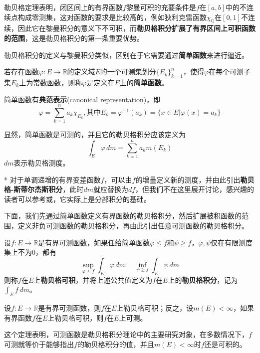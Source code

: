 勒贝格定理\cite{real_analysis}表明，闭区间上的有界函数$f$黎曼可积的充要条件是$f$在$[a,b]$中的不连续点构成零测集，这对函数的要求是比较高的，例如狄利克雷函数$\chi_{\mathbb{Q}}$在$[0,1]$不连续，因此它在黎曼积分的意义下不可积，而\textbf{勒贝格积分扩展了有界区间上可积函数的范围}，这是勒贝格积分的第一条重要优势。

勒贝格积分的定义与黎曼积分类似，区别在于它需要通过\textbf{简单函数}来进行逼近。

\begin{definition}[简单函数]
    若存在函数$\varphi:E\to\mathbb{R}$的定义域$E$的一个可测集划分$\{E_k\}_{k=1}^{n}$，使得$\varphi$在每个可测子集$E_k$上为常数函数，则称$\varphi$是定义在$E$上的\textbf{简单函数}。

    简单函数有\textbf{典范表示}(canonical representation)，即
    \[\varphi=\sum_{k=1}^{n}a_k\chi_{E_k},\text{其中}E_k=\varphi^{-1}(a_k)=\{x\in E|\varphi(x)=a_k\}\]
\end{definition}

显然，简单函数是可测的，并且它的勒贝格积分应该定义为
\[\int_{E}\varphi\,dm=\sum_{k=1}^{n}a_k m(E_k)\]
$dm$表示勒贝格测度。
\begin{remark}*
    对于单调递增的有界变差函数$f$，可以由$f$的增量定义新的测度，并由此引出\textbf{勒贝格-斯蒂尔杰斯积分}，此时$dm$就应替换为$df$，但我们不在这里展开讨论，感兴趣的读者可以参考\cite{simple_real_analysis}或\cite{chentianquan}，它实际上是分部积分的基础。
\end{remark}

下面，我们先通过简单函数定义有界函数的勒贝格积分，然后扩展被积函数的范围，定义非负可测函数的勒贝格积分，再由此引出任意可测函数的勒贝格积分。

\begin{definition}[有界函数的勒贝格积分]
    设$f:E\to\mathbb{R}$是有界可测函数，如果任给简单函数$\varphi\leq f$和$\psi\geq f$，$\varphi,\psi$仅在有限测度集上不为0，都有
    \[\sup_{\varphi\leq f}\int_{E}\varphi\,dm=\inf_{\psi\geq f}\int_{E}\psi\,dm\]
    则称$f$在$E$上\textbf{勒贝格可积}，并将上述公共值定义为$f$在$E$上的\textbf{勒贝格积分}，记为$\int_{E}f\,dm$。
\end{definition}

\begin{theorem}
    设$f:E\to\mathbb{R}$是有界可测函数，则$f$在$E$上勒贝格可积；反之，设$m(E)<\infty$，如果有界函数$f$在$E$上勒贝格可积，则$f$在$E$上可测。
\end{theorem}

这个定理表明，可测函数是勒贝格积分理论中的主要研究对象，在多数情况下，$f$可测就等价于能够指出$f$的勒贝格积分的值，并且$m(E)<\infty$时$f$还是可积的。


